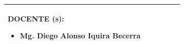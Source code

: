 \documentclass[10pt]{article}   %
\newcommand{\itemTeacher}{Mg. Diego Alonso Iquira Becerra}
\begin{document}
\begin{table}[h!]
\begin{tabular}{|m{2.4cm}|m{2.1cm}|m{2.4cm}|m{2cm}|m{2.64cm}|m{2.42cm}|}
{\begin{minipage}{8cm}
                \vspace{0.5em} %
                DOCENTE (s):
                \begin{itemize}
                    \setlength{\itemsep}{0pt}
                    \setlength{\parskip}{0pt}
                    \setlength{\parsep}{0pt}
                    \item \itemTeacher
                \end{itemize}
                \vspace{0em} %
            \end{minipage}}\\ \hline 	
        \end{tabular}
    \end{table}
    \normalsize
    
    
\end{document}
